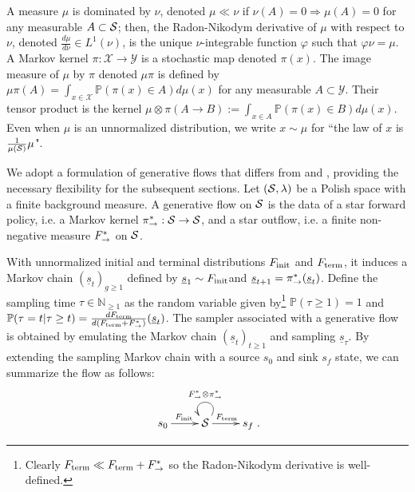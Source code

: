 \documentclass{article}
\theoremstyle{plain}
\theoremstyle{definition}
\theoremstyle{remark}
\theoremstyle{fact}
\begin{document}
    A measure $\mu$ is dominated by $\nu$, denoted $\mu\ll \nu$ if $\nu(A)=0 \Rightarrow \mu(A)=0$ for any measurable $A\subset \mathcal S$; then, the Radon-Nikodym derivative of $\mu$ with respect to $\nu$, denoted $\frac{d\mu}{d\nu}\in L^1(\nu)$, is the unique $\nu$-integrable function $\varphi$ such that $\varphi \nu = \mu$. A 
    Markov kernel $\pi:\mathcal X\rightarrow \mathcal Y$ is a stochastic map denoted $\pi(x)$. The image measure of $\mu$ by $\pi$ denoted $\mu \pi$ is defined by $\mu\pi(A) = \int_{x\in \mathcal X} \mathbb P(\pi(x)\in A) d\mu(x)$ for any measurable $A\subset \mathcal Y$. Their tensor product is the kernel  $\mu\otimes \pi(A\rightarrow B):=\int_{x\in A}\mathbb P(\pi(x)\in B)d\mu(x)$.
    Even when $\mu$ is an unnormalized distribution, we write $x\sim \mu$ for ``the law of $x$ is $\frac{1}{\mu(\mathcal S)}\mu$".
    
    We adopt a formulation of generative flows that differs from \citet{lahlou2023theory} and \citet{brunswic2024theory}, providing the necessary flexibility for the subsequent sections. Let $(\mathcal S,\lambda)$ be a Polish space with a finite background measure. A generative flow on $\mathcal S$ is the data of a star forward policy, i.e. a Markov kernel $\pi_{\rightarrow}^*:\mathcal S\rightarrow \mathcal S$, and a star outflow, i.e. a finite non-negative measure $F^*_{\rightarrow}$ on $\mathcal S$. 
    
    With unnormalized initial and terminal distributions $F_{\mathrm{init}}$ and $F_{\mathrm{term}}$,  it induces a Markov chain $(\underline s_t)_{g\geq 1}$ defined by $\underline s_{1}\sim F_{\mathrm{init}}$and $\underline s_{t+1} = \pi_{\rightarrow}^*(\underline s_t)$. 
    Define the sampling time $\tau \in \mathbb N_{\geq 1}$ as the random variable given by\footnote{Clearly $F_{\mathrm{term}} \ll F_{\mathrm{term}}+F^*_{\rightarrow}$ so the Radon-Nikodym derivative is well-defined.} $\mathbb P(\tau\geq 1)=1$ and $\mathbb P(\tau = t|\tau\geq t) = \frac{dF_{\mathrm{term}}}{d(F_{\mathrm{term}}+F^*_{\rightarrow})}(\underline s_t)$. 
    The sampler associated with a generative flow is obtained by emulating the Markov chain $(\underline s_t)_{t\geq1}$ and sampling $\underline s_\tau$.
    By extending the sampling Markov chain with a source $s_0$ and sink $s_f$ state, we can summarize the flow as follows:
    \begin{equation}
        \xymatrix{
        s_0 \ar[r]^\Finit&\Statespace \ar@(ur,ul)_{\Foutstar\otimes\ForwardPolicyStar}\ar[r]^\Fterm& s_f
        }.
    \end{equation}
\end{document}
